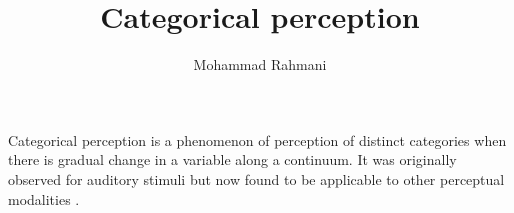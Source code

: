 \documentclass[a4paper]{article}
\title{Categorical perception}
\date{}
\author{Mohammad Rahmani}
\begin{document}
\maketitle
    Categorical perception is a phenomenon of perception of distinct categories when there is gradual change in a variable along a continuum. It was originally observed for auditory stimuli but now found to be applicable to other perceptual modalities .
    
    
\end{document}
